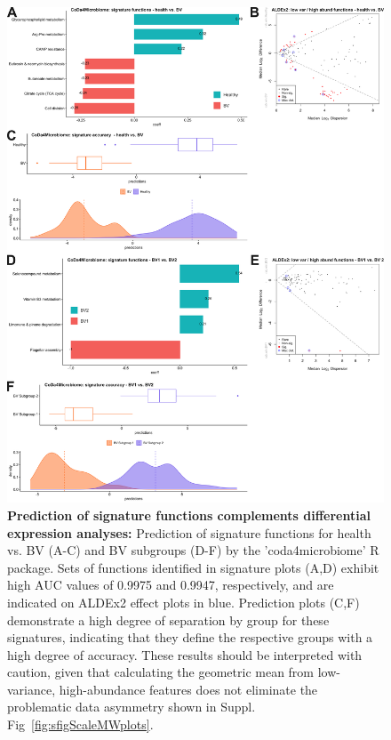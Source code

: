 \documentclass[sn-mathphys,Numbered]{sn-jnl}%
\begin{document}
\begin{figure}[H]
    \centering
    \includegraphics[scale = 0.84]{0_supplFig8.png}
    \caption{\textbf{Prediction of signature functions complements differential expression analyses:} Prediction of signature functions for health vs. BV (A-C) and BV subgroups (D-F) by the 'coda4microbiome' R package. Sets of functions identified in signature plots (A,D) exhibit high AUC values of 0.9975 and 0.9947, respectively, and are indicated on ALDEx2 effect plots in blue. Prediction plots (C,F) demonstrate a high degree of separation by group for these signatures, indicating that they define the respective groups with a high degree of accuracy. These results should be interpreted with caution, given that calculating the geometric mean from low-variance, high-abundance features does not eliminate the problematic data asymmetry shown in Suppl. Fig~\ref{fig:sfigScaleMWplots}.} \label{fig:sfigVirgCoda4Mfigs}
\end{figure}
\newpage
\end{document}
